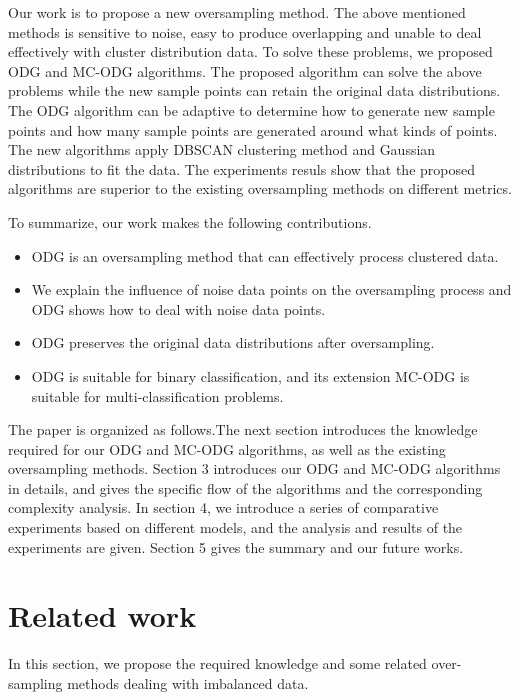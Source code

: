 \documentclass[runningheads]{llncs}
\begin{document}
Our work is to propose a new oversampling method.
The above mentioned methods is sensitive to noise, 
easy to produce overlapping and unable to deal effectively with cluster distribution data.
To solve these problems, 
we proposed ODG and MC-ODG algorithms.
The proposed algorithm can solve the above problems 
while the new sample points can retain the original data distributions.
The ODG algorithm can be adaptive to determine how to 
generate new sample points and how many sample points are generated around what kinds of points.
The new algorithms apply DBSCAN clustering method and Gaussian
 distributions\cite{SEEGER2004GAUSSIAN} to fit the data.
 The experiments resuls show that
 the proposed algorithms are superior to the existing oversampling 
 methods on different metrics.

To summarize, our work makes the following contributions.
\begin{itemize}
  \item ODG is an oversampling method that can effectively process clustered data.
  \item We explain the influence of noise data points on the oversampling process 
  and ODG shows how to deal with noise data points.
  \item ODG preserves the original data distributions after oversampling.
  \item ODG is suitable for binary classification, and its extension MC-ODG is suitable for multi-classification problems.
\end{itemize}

The paper is organized as follows.The next section introduces 
the knowledge required for our ODG and MC-ODG algorithms, 
as well as the existing oversampling methods. Section 3 introduces our ODG and MC-ODG 
algorithms in details, 
and gives the specific flow of the algorithms and the corresponding complexity analysis.
In section 4, we introduce a series 
of comparative experiments based on different models, 
and the analysis and results of the experiments
are given. Section 5 gives the summary and our future works.


\section{Related work}
In this section,
 we propose the required knowledge and some related over-sampling methods dealing with imbalanced data.
\end{document}
